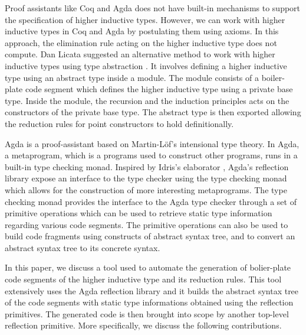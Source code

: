 \documentclass[sigplan,10pt]{acmart}
\begin{document}
Proof assistants like Coq \cite{Coq-2009} and Agda \cite{Agda-2007} does not have built-in mechanisms to support the specification of higher inductive types. However, we can work with higher inductive types in Coq and Agda by postulating them using axioms. In this approach, the elimination rule acting on the higher inductive type does not compute. Dan Licata suggested an alternative method to work with higher inductive types using type abstraction \cite{Licata-2011}. It involves defining a higher inductive type using an abstract type inside a module. The module consists of a boiler-plate code segment which defines the higher inductive type using a private base type. Inside the module, the recursion and the induction principles acts on the constructors of the private base type. The abstract type is then exported allowing the reduction rules for point constructors to hold definitionally.

Agda is a proof-assistant based on Martin-Löf’s intensional type theory. In Agda, a metaprogram, which is a programs used to construct other programs, runs in a built-in type checking monad. Inspired by Idris’s elaborator \cite{David-2016}, Agda’s reflection library expose an interface to the type checker using the type checking monad which allows for the construction of more interesting metaprograms. The type checking monad provides the interface to the Agda type checker through a set of primitive operations which can be used to retrieve static type information regarding various code segments. The primitive operations can also be used to build code fragments using constructs of abstract syntax tree, and to convert an abstract syntax tree to its concrete syntax.

In this paper, we discuss a tool used to automate the generation of bolier-plate code segments of the higher inductive type and its reduction rules. This tool extensively uses the Agda reflection library and it builds the abstract syntax tree of the code segments with static type informations obtained using the reflection primitives. The generated code is then brought into scope by another top-level reflection primitive. More specifically, we discuss the following contributions.
\end{document}
